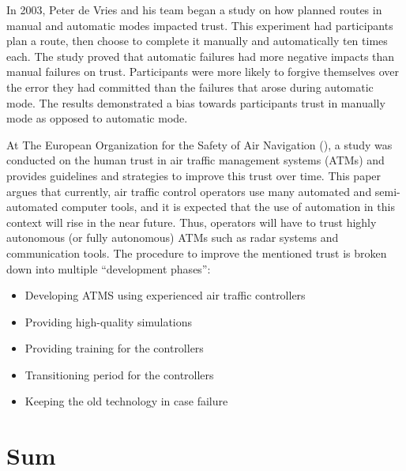 \documentclass[runningheads,a4paper]{llncs}
\begin{document}
In 2003, Peter de Vries and his team began a study on how planned routes in manual and automatic modes impacted trust\cite{de2003effects}.  This experiment had participants plan a route, then choose to complete it manually and automatically ten times each.  The study proved that automatic failures had more negative impacts than manual failures on trust.  Participants were more likely to forgive themselves over the error they had committed than the failures that arose during automatic mode.  The results demonstrated a bias towards participants trust in manually mode as opposed to automatic mode.

At The European Organization for the Safety of Air Navigation (\cite{kelly2003guidelines}), a study was conducted on the human trust in air traffic management systems (ATMs) and provides guidelines and strategies to improve this trust over time. This paper argues that currently, air traffic control operators use many automated and semi-automated computer tools, and it is expected that the use of automation in this context will rise in the near future. Thus, operators will have to trust highly autonomous (or fully autonomous) ATMs such as radar systems and communication tools. The procedure to improve the mentioned trust is broken down into multiple ``development phases'':
\begin{itemize}
    \item Developing ATMS using experienced air traffic controllers
    \item Providing high-quality simulations
    \item Providing training for the controllers
    \item Transitioning period for the controllers
    \item Keeping the old technology in case failure
\end{itemize}


\section{Sum}
\end{document}
